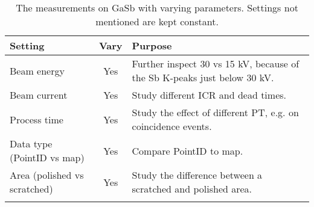 \begin{table}[hbtp]
    \begin{center}
        \caption{
            The measurements on GaSb with varying parameters.
            Settings not mentioned are kept constant.
        }
        \renewcommand*{\arraystretch}{1.4}
        \label{tab:method:acquisition_settings:other}
        \begin{tabular}{p{4cm}cp{8cm}}
            \hline
            \textbf{Setting}             & \textbf{Vary} & \textbf{Purpose}                                                         \\
            \hline
            Beam energy                  & Yes           & Further inspect 30 vs 15 kV, because of the Sb K-peaks just below 30 kV. \\
            Beam current                 & Yes           & Study different ICR and dead times.                                      \\
            Process time                 & Yes           & Study the effect of different PT, e.g. on coincidence events.            \\
            Data type (PointID vs map)   & Yes           & Compare PointID to map.                                                  \\
            Area (polished vs scratched) & Yes           & Study the difference between a scratched and polished area.              \\
            \hline                                                                                                                  \\
        \end{tabular}
    \end{center}
\end{table}
